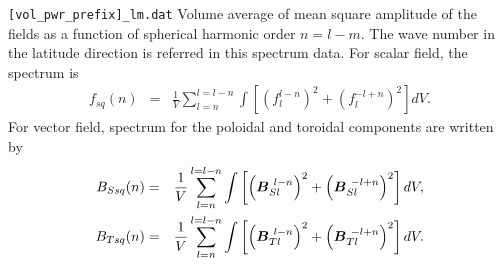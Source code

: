 \begin{description}
\item{\tt [vol\_pwr\_prefix]\_lm.dat} Volume average of mean square amplitude of the fields as a function of spherical harmonic order $n = l-m$. The wave number in the latitude direction is referred in this spectrum data. For scalar field, the spectrum is
\begin{eqnarray}
f_{sq}(n) &=& \frac{1}{V} \sum_{l=n}^{l=l-n} \int \left[ \left(f_{l}^{l-n}\right)^{2} + \left(f_{l}^{-l+n}\right)^2 \right] dV.
\nonumber
\end{eqnarray}
For vector field, spectrum for the poloidal and toroidal components are written by 
\begin{eqnarray}
B_{Ssq}(n) &=& \frac{1}{V} \sum_{l=n}^{l=l-n} \int  \left[\left(\mbox{\boldmath$B$}_{Sl}^{\ l-n} \right)^{2} 
 + \left(\mbox{\boldmath$B$}_{Sl}^{\ -l+n} \right)^{2}  \right]  dV,
\nonumber \\
B_{Tsq}(n) &=& \frac{1}{V} \sum_{l=n}^{l=l-n} \int \left[\left(\mbox{\boldmath$B$}_{Tl}^{\ l-n} \right)^{2} 
 + \left(\mbox{\boldmath$B$}_{Tl}^{\ -l+n} \right)^{2}  \right] dV.
\nonumber
\end{eqnarray}

\end{description}
%

